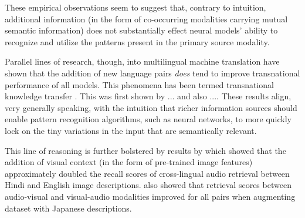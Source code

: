 These empirical observations seem to suggest that, contrary to intuition, additional information (in the form of co-occurring modalities carrying mutual semantic information) does not substantially effect neural models' ability to recognize and utilize the patterns present in the primary source modality.

Parallel lines of research, though, into multilingual machine translation have shown that the addition of new language pairs \textit{does} tend to improve transnational performance of all models. 
This phenomena has been termed transnational knowledge transfer .
This was first shown by ...  and also ....
These results align, very generally speaking, with the intuition that richer information sources should enable pattern recognition algorithms, such as neural networks, to more quickly lock on the tiny variations in the input that are semantically relevant. 

This line of reasoning is further bolstered by results by  which showed that the addition of visual context (in the form of pre-trained image features) approximately doubled the recall scores of cross-lingual audio retrieval between Hindi and English image descriptions.
\citeme[Ohishi et al.] also showed that retrieval scores between audio-visual and visual-audio modalities improved for all pairs when augmenting \citeme[Harwaths] dataset with Japanese descriptions.






